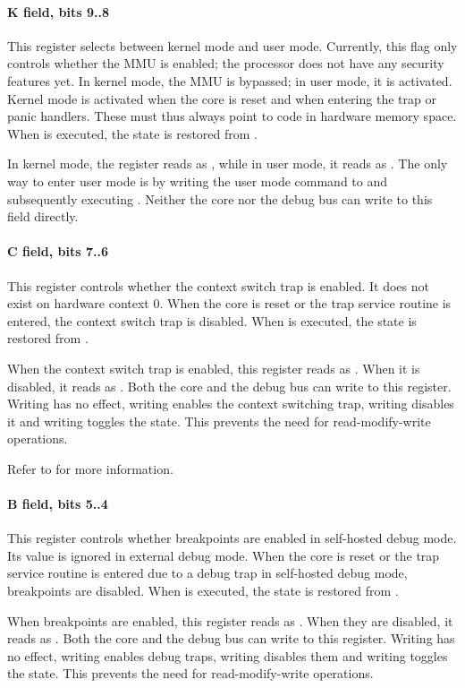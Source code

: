 \paragraph*{K field, bits 9..8}
This register selects between kernel mode and user mode. Currently, this flag
only controls whether the MMU is enabled; the \rvex{} processor does not have
any security features yet. In kernel mode, the MMU is bypassed; in user mode, it
is activated. Kernel mode is activated when the core is reset and when entering
the trap or panic handlers. These must thus always point to code in hardware
memory space. When  is executed, the state is restored from
.

In kernel mode, the register reads as , while in user mode, it reads as
. The only way to enter user mode is by writing the user mode command
to  and subsequently executing . Neither the core nor the
debug bus can write to this field directly.
\paragraph*{C field, bits 7..6}
This register controls whether the context switch trap is enabled. It does not
exist on hardware context 0. When the core is reset or the trap service routine
is entered, the context switch trap is disabled. When  is executed,
the state is restored from .

When the context switch trap is enabled, this register reads as . When
it is disabled, it reads as . Both the core and the debug bus can write
to this register. Writing  has no effect, writing  enables the
context switching trap, writing  disables it and writing 
toggles the state. This prevents the need for read-modify-write operations.

Refer to  for more information.
\paragraph*{B field, bits 5..4}
This register controls whether breakpoints are enabled in self-hosted debug
mode. Its value is ignored in external debug mode. When the core is reset or the
trap service routine is entered due to a debug trap in self-hosted debug mode,
breakpoints are disabled. When  is executed, the state is restored
from .

When breakpoints are enabled, this register reads as . When they are
disabled, it reads as . Both the core and the debug bus can write to
this register. Writing  has no effect, writing  enables debug
traps, writing  disables them and writing  toggles the state.
This prevents the need for read-modify-write operations.
